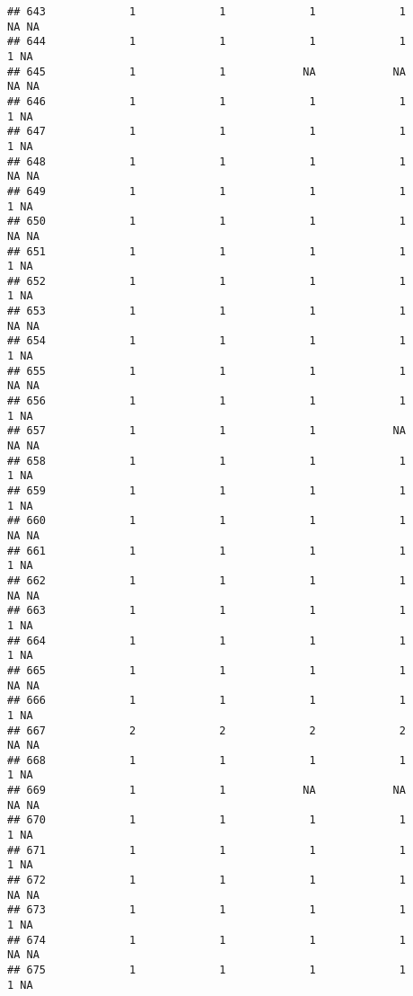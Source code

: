 \documentclass[
]{article}
\begin{document}
\begin{verbatim}
## 643             1             1             1             1            NA NA
## 644             1             1             1             1             1 NA
## 645             1             1            NA            NA            NA NA
## 646             1             1             1             1             1 NA
## 647             1             1             1             1             1 NA
## 648             1             1             1             1            NA NA
## 649             1             1             1             1             1 NA
## 650             1             1             1             1            NA NA
## 651             1             1             1             1             1 NA
## 652             1             1             1             1             1 NA
## 653             1             1             1             1            NA NA
## 654             1             1             1             1             1 NA
## 655             1             1             1             1            NA NA
## 656             1             1             1             1             1 NA
## 657             1             1             1            NA            NA NA
## 658             1             1             1             1             1 NA
## 659             1             1             1             1             1 NA
## 660             1             1             1             1            NA NA
## 661             1             1             1             1             1 NA
## 662             1             1             1             1            NA NA
## 663             1             1             1             1             1 NA
## 664             1             1             1             1             1 NA
## 665             1             1             1             1            NA NA
## 666             1             1             1             1             1 NA
## 667             2             2             2             2            NA NA
## 668             1             1             1             1             1 NA
## 669             1             1            NA            NA            NA NA
## 670             1             1             1             1             1 NA
## 671             1             1             1             1             1 NA
## 672             1             1             1             1            NA NA
## 673             1             1             1             1             1 NA
## 674             1             1             1             1            NA NA
## 675             1             1             1             1             1 NA

\end{verbatim}
\end{document}
